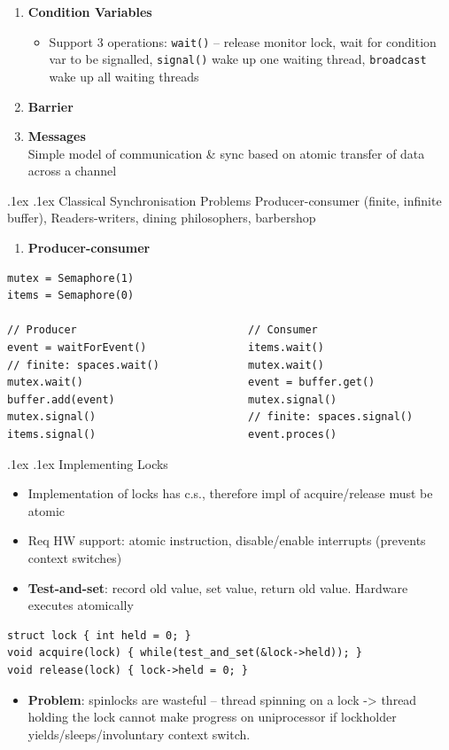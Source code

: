 \documentclass[10pt,landscape,a4paper]{article}
\makeatletter
\renewcommand{\subsection}{\@startsection{subsection}{1}{0mm}%
  {.1ex}%
  {.1ex}%
{\sffamily\bfseries}}
\renewcommand{\subsubsection}{\@startsection{subsubsection}{1}{0mm}%
  {.1ex}%
  {.1ex}%
{\rmfamily\bfseries}}
\makeatother
\begin{document}
\begin{multicols*}{4}
\begin{enumerate}
\begin{itemize}
          \end{itemize}
    \item \textbf{Condition Variables}
          \begin{itemize}
            \item Support 3 operations: \texttt{wait()} -- release monitor lock, wait for condition var to be signalled, \texttt{signal()} wake up one waiting thread, \texttt{broadcast} wake up all waiting threads
          \end{itemize}
    \item \textbf{Barrier}
    \item \textbf{Messages}\\
          Simple model of communication \& sync based on atomic transfer of data across a channel
  \end{enumerate}
  \subsubsection{Classical Synchronisation Problems}
  Producer-consumer (finite, infinite buffer), Readers-writers, dining philosophers, barbershop
  \begin{enumerate}
    \item \textbf{Producer-consumer}
  \end{enumerate}
  \begin{verbatim}
mutex = Semaphore(1)
items = Semaphore(0)

// Producer                           // Consumer
event = waitForEvent()                items.wait()
// finite: spaces.wait()              mutex.wait()
mutex.wait()                          event = buffer.get()
buffer.add(event)                     mutex.signal()
mutex.signal()                        // finite: spaces.signal()
items.signal()                        event.proces()
\end{verbatim}
  \subsection{Implementing Locks}
  \begin{itemize}
    \item Implementation of locks has c.s., therefore impl of acquire/release must be atomic
    \item Req HW support: atomic instruction, disable/enable interrupts (prevents context switches)
    \item \textbf{Test-and-set}: record old value, set value, return old value. Hardware executes atomically
  \end{itemize}
  \begin{verbatim}
struct lock { int held = 0; }
void acquire(lock) { while(test_and_set(&lock->held)); }
void release(lock) { lock->held = 0; }
  \end{verbatim}
  \begin{itemize}
    \item \textbf{Problem}: spinlocks are wasteful -- thread spinning on a lock -> thread holding the lock cannot make progress on uniprocessor if lockholder yields/sleeps/involuntary context switch.
  \end{itemize}

\end{multicols*}
\end{document}
